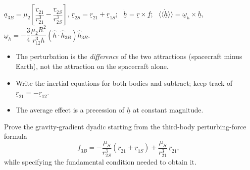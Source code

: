 \begin{keyf}
$\underline a_{3B}=\mu_2\left[\dfrac{\underline r_{21}}{r_{21}^3}-\dfrac{\underline r_{2S}}{r_{2S}^3}\right]$, $\underline r_{2S}=\underline r_{21}+\underline r_{1S}$; \
$\dot{\underline h}=\underline r\times\underline f$; \ $\langle\langle\dot{\underline h}\rangle\rangle=\underline\omega_h\times\underline h$, \
$\underline\omega_h=-\dfrac34\dfrac{\mu_2R^2}{r_{12}^3h}(\hat h\cdot\hat h_{3B})\hat h_{3B}$.
\end{keyf}

\pitfalls
\begin{itemize}
\item The perturbation is the \emph{difference} of the two attractions (spacecraft minus Earth), not the attraction on the spacecraft alone.
\item Write the inertial equations for both bodies and subtract; keep track of $\underline r_{21}=-\underline r_{12}$.
\item The average effect is a precession of $\underline h$ at constant magnitude.
\end{itemize}


\begin{qbox}
Prove the gravity-gradient dyadic starting from the third-body perturbing-force formula
\[
\underline f_{3B}=-\frac{\mu_S}{r_{2S}^3}\left(\underline r_{21}+\underline r_{1S}\right)+\frac{\mu_S}{r_{21}^3}\,\underline r_{21},
\]
while specifying the fundamental condition needed to obtain it.
\end{qbox}

